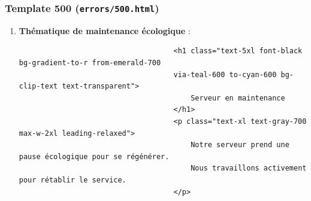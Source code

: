\documentclass[a4paper,11pt]{article}
\begin{document}
                \subsubsection{Template 500 (\texttt{errors/500.html})}
                    \begin{enumerate}
                        \item \textbf{Thématique de maintenance écologique} :
                            \begin{tcolorbox}[colback=lightgray!5, colframe=gray!80, left=-70mm, right=5mm, top=2mm, bottom=0mm, boxrule=0.1mm]
                                \begin{verbatim}
                                    <h1 class="text-5xl font-black bg-gradient-to-r from-emerald-700 
                                    via-teal-600 to-cyan-600 bg-clip-text text-transparent">
                                        Serveur en maintenance
                                    </h1>
                                    <p class="text-xl text-gray-700 max-w-2xl leading-relaxed">
                                        Notre serveur prend une pause écologique pour se régénérer. 
                                        Nous travaillons activement pour rétablir le service.
                                    </p>
                                \end{verbatim}
                            \end{tcolorbox}


\end{enumerate}
\end{document}
